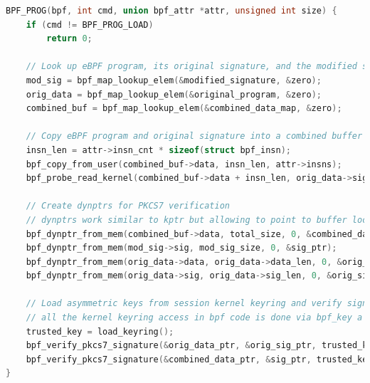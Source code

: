 \documentclass [11pt, proquest] {uwthesis}[2020/02/24]
\begin{document}
\begin{lstlisting}[language=C, caption={Kernel BPF LSM Hook for PKCS7 Signature Verification}, label={lst:bpf-lsm}]
BPF_PROG(bpf, int cmd, union bpf_attr *attr, unsigned int size) {
    if (cmd != BPF_PROG_LOAD)
        return 0;

    // Look up eBPF program, its original signature, and the modified signature
    mod_sig = bpf_map_lookup_elem(&modified_signature, &zero);
    orig_data = bpf_map_lookup_elem(&original_program, &zero);
    combined_buf = bpf_map_lookup_elem(&combined_data_map, &zero);

    // Copy eBPF program and original signature into a combined buffer
    insn_len = attr->insn_cnt * sizeof(struct bpf_insn);
    bpf_copy_from_user(combined_buf->data, insn_len, attr->insns);
    bpf_probe_read_kernel(combined_buf->data + insn_len, orig_data->sig_len, orig_data->sig);

    // Create dynptrs for PKCS7 verification
    // dynptrs work similar to kptr but allowing to point to buffer location storing large amount of data as in case of signature for eBPF verifier requirements. 
    bpf_dynptr_from_mem(combined_buf->data, total_size, 0, &combined_data_ptr);
    bpf_dynptr_from_mem(mod_sig->sig, mod_sig_size, 0, &sig_ptr);
    bpf_dynptr_from_mem(orig_data->data, orig_data->data_len, 0, &orig_data_ptr);
    bpf_dynptr_from_mem(orig_data->sig, orig_data->sig_len, 0, &orig_sig_ptr);

    // Load asymmetric keys from session kernel keyring and verify signatures
    // all the kernel keyring access in bpf code is done via bpf_key a wrapper over kernel core key structure accessed from userspace via keyctl
    trusted_key = load_keyring();
    bpf_verify_pkcs7_signature(&orig_data_ptr, &orig_sig_ptr, trusted_key);
    bpf_verify_pkcs7_signature(&combined_data_ptr, &sig_ptr, trusted_key);
}
\end{lstlisting}
\end{document}
